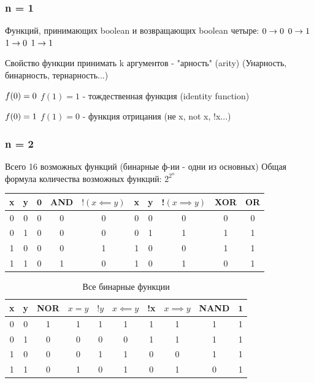 \subsubsection{n = 1}
Функций, принимающих boolean и возвращающих boolean четыре: \newline
$0 \rightarrow 0 \newline$
$0 \rightarrow 1 \newline$
$1 \rightarrow 0 \newline$
$1 \rightarrow 1 \newline$

Свойство функции принимать k аргументов - "арность" (arity)
(Унарность, бинарность, тернарность...)

$f(0) = 0 \newline$
$f(1) = 1$ - тождественная функция (identity function)

$f(0) = 1 \newline$
$f(1) = 0$ - функция отрицания (не x, not x, !x...)

\subsubsection{n = 2}
Всего 16 возможных функций (бинарные ф-ии - одни из основных)
Общая формула количества возможных функций: $ 2^{2^{n}}$

\begin{table}
    \centering
    \begin{tabular}{ |c|c|c|c|c|c|c|c|c|c| }
        \hline
         x & y & $\mathbf{0}$ & AND & $!(x \impliedby y)$ & x & y & !$(x \implies y)$ & XOR & OR \\
         \hline
         0 & 0 & 0 & 0 & 0 & 0 & 0 & 0 & 0 & 0 \\
         0 & 1 & 0 & 0 & 0 & 0 & 1 & 1 & 1 & 1 \\
         1 & 0 & 0 & 0 & 1 & 1 & 0 & 0 & 1 & 1 \\
         1 & 1 & 0 & 1 & 0 & 1 & 0 & 1 & 0 & 1 \\
         \hline
    \end{tabular}
    \label{tab:my_label}
\end{table}

\begin{table}
    \centering
    \begin{tabular}{ |c|c|c|c|c|c|c|c|c|c| }
        \hline
         x & y & NOR & $x = y$ & $!y$ & $x \impliedby y$ & !x & $x \implies y$ & NAND & $\mathbf{1}$ \\
         \hline
         0 & 0 & 1 & 1 & 1 & 1 & 1 & 1 & 1 & 1 \\
         0 & 1 & 0 & 0 & 0 & 0 & 1 & 1 & 1 & 1 \\
         1 & 0 & 0 & 0 & 1 & 1 & 0 & 0 & 1 & 1 \\
         1 & 1 & 0 & 1 & 0 & 1 & 0 & 1 & 0 & 1 \\
         \hline
    \end{tabular}
    \caption{Все бинарные функции}
    \label{tab:my_label}
\end{table}


